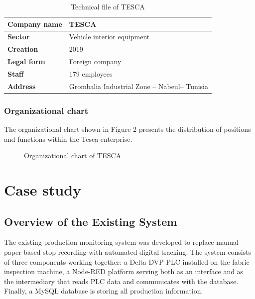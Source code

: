 \begin{table}[H]
    \centering
    \caption{Technical file of TESCA}
\begin{tabularx}{\textwidth}{|P{0.34\textwidth}|Y|}
        \hline
        \textbf{Company name} & \textbf{TESCA} \\
        \hline
        \textbf{Sector} & Vehicle interior equipment \\
        \hline
        \textbf{Creation} & 2019 \\
        \hline
        \textbf{Legal form} & Foreign company \\
        \hline
        \textbf{Staff} & 179 employees \\
        \hline
        \textbf{Address} & Grombalia Industrial Zone – Nabeul– Tunisia \\
        \hline
    \end{tabularx}
\end{table}

\subsubsection{\fontsize{13}{16}\selectfont Organizational chart}

The organizational chart shown in Figure 2 presents the distribution of positions and functions within the Tesca enterprise.

\begin{figure}[H]
    \centering
    \caption{Organizational chart of TESCA}
    \label{fig:chapter1-2}
\end{figure}

\section{\fontsize{15}{18}\selectfont Case study}

\subsection{\fontsize{14}{17}\selectfont Overview of the Existing System}

\hspace*{0.44cm} The existing production monitoring system was developed  to replace manual paper-based stop recording with automated digital tracking. The system consists of three components working together: a Delta DVP PLC installed on the fabric inspection machine, a Node-RED platform serving both as an interface and as the intermediary that reads PLC data and communicates with the database. Finally, a MySQL database is storing all production information.

